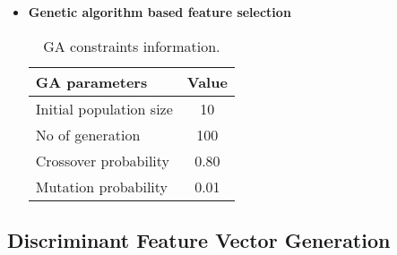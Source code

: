 \begin{frame}[t]{\subsecname}
	\topline
    \begin{itemize}
    	\item \textcolor{navy_theme}{\textbf{Genetic algorithm based feature selection}}
    	\vspace{2em}
    	\begin{table}[!ht]
        	\caption{GA constraints information.}
        	\label{table:GA}
        	\begin{center}
        		\begin{tabular}{|l|c|}
        			\hline
        			GA parameters           & Value \\ \hline
        			Initial population size & 10    \\
        			No of generation        & 100   \\ Crossover probability & 0.80 \\
        			Mutation probability    & 0.01  \\ \hline
        		\end{tabular}%
    	    \end{center}
        \end{table}
	\end{itemize}
\end{frame}



\subsection{Discriminant Feature Vector Generation}




